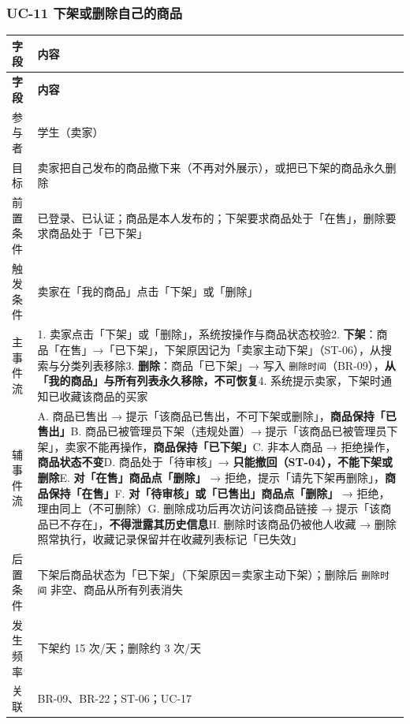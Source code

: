 \documentclass[12pt,a4paper]{ctexart}
\begin{document}
\subsubsection*{UC-11 下架或删除自己的商品}

{\scriptsize
\begin{longtable}{|p{2.75cm}|p{13.25cm}|}
\hline
\textbf{字段} & \textbf{内容} \\
\hline
\endfirsthead
\hline
\textbf{字段} & \textbf{内容} \\
\hline
\endhead
\hline
\endfoot
参与者 & 学生（卖家） \\
\hline
目标 & 卖家把自己发布的商品撤下来（不再对外展示），或把已下架的商品永久删除 \\
\hline
前置条件 & 已登录、已认证；商品是本人发布的；下架要求商品处于「在售」，删除要求商品处于「已下架」 \\
\hline
触发条件 & 卖家在「我的商品」点击「下架」或「删除」 \\
\hline
主事件流 & 1. 卖家点击「下架」或「删除」，系统按操作与商品状态校验\newline{}2. \textbf{下架}：商品「在售」→「已下架」，下架原因记为「卖家主动下架」（ST-06），从搜索与分类列表移除\newline{}3. \textbf{删除}：商品「已下架」→ 写入 \texttt{删除时间}（BR-09），\textbf{从「我的商品」与所有列表永久移除，不可恢复}\newline{}4. 系统提示卖家，下架时通知已收藏该商品的买家 \\
\hline
辅事件流 & A. 商品已售出 → 提示「该商品已售出，不可下架或删除」，\textbf{商品保持「已售出」}\newline{}B. 商品已被管理员下架（违规处置）→ 提示「该商品已被管理员下架」，卖家不能再操作，\textbf{商品保持「已下架」}\newline{}C. 非本人商品 → 拒绝操作，\textbf{商品状态不变}\newline{}D. 商品处于「待审核」→ \textbf{只能撤回（ST-04），不能下架或删除}\newline{}E. \textbf{对「在售」商品点「删除」} → 拒绝，提示「请先下架再删除」，\textbf{商品保持「在售」}\newline{}F. \textbf{对「待审核」或「已售出」商品点「删除」} → 拒绝，理由同上（不可删除）\newline{}G. 删除成功后再次访问该商品链接 → 提示「该商品已不存在」，\textbf{不得泄露其历史信息}\newline{}H. 删除时该商品仍被他人收藏 → 删除照常执行，收藏记录保留并在收藏列表标记「已失效」 \\
\hline
后置条件 & 下架后商品状态为「已下架」（下架原因＝卖家主动下架）；删除后 \texttt{删除时间} 非空、商品从所有列表消失 \\
\hline
发生频率 & 下架约 15 次/天；删除约 3 次/天 \\
\hline
关联 & BR-09、BR-22；ST-06；UC-17 \\
\hline
\end{longtable}
}
\end{document}
